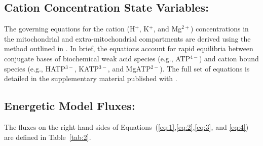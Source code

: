 \documentclass[fleqn,10pt]{physiome}
\begin{document}
\subsection{Cation Concentration State Variables:}

The governing equations for the cation (H$^+$, K$^+$, and Mg$^{2+}$) concentrations in the mitochondrial and extra-mitochondrial compartments are derived using the method outlined in \cite{Vinnakota2009}. In brief, the equations account for rapid equilibria between conjugate bases of biochemical weak acid species (e.g., ATP$^{4-}$) and cation bound species (e.g., HATP$^{3-}$, KATP$^{3-}$, and MgATP$^{2-}$). The full set of equations is detailed in the supplementary material published with \cite{Bazil2016}.

\subsection{Energetic Model Fluxes:}

The fluxes on the right-hand sides of Equations~(\ref{eq:1},\ref{eq:2},\ref{eq:3}, and \ref{eq:4}) are defined in Table~\ref{tab:2}.
\end{document}

